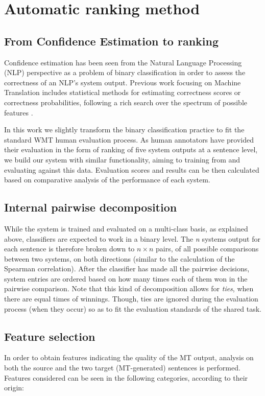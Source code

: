 \documentclass[11pt]{article}
\begin{document}
\section{Automatic ranking method}
\subsection{From Confidence Estimation to ranking}
Confidence estimation has been seen from the Natural Language Processing (NLP)
perspective as a problem of binary classification in order to assess the
correctness of an NLP's system output. Previous work focusing on Machine
Translation includes statistical methods for estimating correctness scores or
correctness probabilities, following a rich search over the spectrum of
possible features
\cite{Blatz04confidenceestimation,Ueffing05word-levelconfidence,Specia09TWSS,raybaud2009word,Rosti07combiningoutputs}.

In this work we slightly transform the binary classification practice to fit the standard WMT human evaluation process. As human annotators have provided their evaluation in the form of ranking of five system outputs at a sentence level, we build our system with similar functionality, aiming to training from and evaluating against this data. Evaluation scores and results
can be then calculated based on comparative analysis of the performance
of each system.

\subsection{Internal pairwise decomposition\label{Internal pairwise
decomposition} }
While the system is trained and evaluated on a multi-class basis, as explained
above, classifiers are expected to work in a binary level. The \textit{n}
systems output for each sentence is therefore broken down to \(n \times n\)
pairs, of all possible comparisons between two systems, on both directions (similar to the calculation of the Spearman correlation). After the classifier has made all
the pairwise decisions, system entries are ordered based on how many times each
of them won in the pairwise comparison. Note that this kind
of decomposition allows for \textit{ties}, when there are equal times of
winnings. Though, ties are ignored during the evaluation process (when they
occur) so as to fit the evaluation standards of the shared task.

\subsection{Feature selection}
In order to obtain features indicating the quality of the MT output, analysis on
both the source and the two target (MT-generated) sentences is performed. Features
considered can be seen in the following categories, according to their origin:
\end{document}

